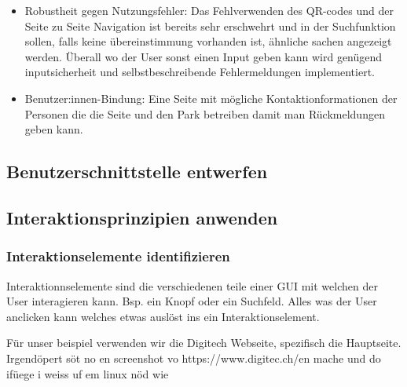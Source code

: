 \documentclass[10pt]{article}
\newcounter{subsubsubsection}[subsubsection]
\begin{document}
\begin{itemize}
		\item Robustheit gegen Nutzungsfehler: Das Fehlverwenden des QR-codes und der Seite zu Seite Navigation ist bereits sehr erschwehrt und in der Suchfunktion sollen, falls keine übereinstimmung vorhanden ist, ähnliche sachen angezeigt werden. Überall wo der User sonst einen Input geben kann wird genügend inputsicherheit und selbstbeschreibende Fehlermeldungen implementiert.
		
		\item Benutzer:innen-Bindung: Eine Seite mit mögliche Kontaktionformationen der Personen die die Seite und den Park betreiben damit man Rückmeldungen geben kann. 
		
	\end{itemize}
	\subsection{Benutzerschnittstelle entwerfen}
	\subsection{Interaktionsprinzipien anwenden}
	\subsubsection{Interaktionselemente identifizieren}
	
	Interaktionnselemente sind die verschiedenen teile einer GUI mit welchen der User interagieren kann. Bsp. ein Knopf oder ein Suchfeld. Alles was der User anclicken kann welches etwas auslöst ins ein Interaktionselement.
	
	Für unser beispiel verwenden wir die Digitech Webseite, spezifisch die Hauptseite.\newline\\ 
	
	
	Irgendöpert söt no en screenshot vo https://www.digitec.ch/en mache und do ifüege i weiss uf em linux nöd wie
	
\end{document}
